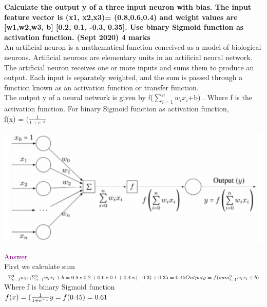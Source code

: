 \textbf{\textcolor{LightMagenta}{Calculate the output y of a three input neuron with bias. The input feature vector is (x1, x2,x3)= (0.8,0.6,0.4) and weight values are [w1,w2,w3, b]  [0.2, 0.1, -0.3, 0.35]. Use binary Sigmoid function as activation function. (Sept 2020) \hfill 4 marks}} \\[5pt]

An artificial neuron is a mathematical function conceived as a model of biological
neurons. Artificial neurons are elementary units in an artificial neural network. The
artificial neuron receives one or more inputs and sums them to
produce an output. Each input is separately weighted, and the sum is passed through a
function known as an activation function or transfer function. \\[5pt]
The output y of a neural network is given by f($\sum_{i=1}^n w_ix_i$+b) . Where f is the activation function. For binary Sigmoid function as activation function,\\ 

f(x) = \begin{math} ( \frac{1}{ 1+ e^{-x} }  \end{math}
\begin{center}
  \includegraphics[width=.8\textwidth]{Images/A18_IMG1.png}  
\end{center}

\textcolor{purple}{\underline{Answer}} \\
First we calculate sum \begin{math} \Sigma_{n=1}^3 w_ix_i \\ [5pt]
\Sigma_{n=1}^3 w_ix_i +b  = 0.8*0.2 + 0.6*0.1 + 0.4*(-0.3) + 0.35 = 0.45
\\ [5pt]
Output y = f(sum_{i=1}^3 w_ix_i+b) \\ [5pt]
\end{math}
Where f is binary Sigmoid function \\ [5pt]
\begin{math}
f(x) = ( \frac{1}{ 1+ e^{-x} }  \\ [5pt]
y = f(0.45) = 0.61
\end{math}